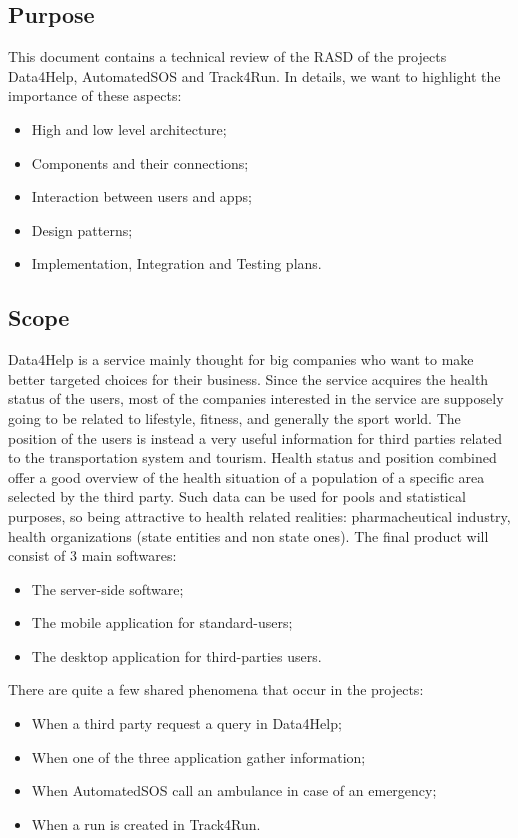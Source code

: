 {\color{secblue}\subsection{Purpose}}
This document contains a technical review of the RASD of the projects Data4Help, AutomatedSOS and Track4Run.
In details, we want to highlight the importance of these aspects:
\begin{itemize}
\item High and low level architecture;
\item Components and their connections;
\item Interaction between users and apps;
\item Design patterns;
\item Implementation, Integration and Testing plans.
\end{itemize}
{\color{secblue}\subsection{Scope}}
Data4Help is a service mainly thought for big companies who want to make better targeted choices for their business. Since the service acquires the health status of the users, most of the companies interested in the service are supposely going to be related to lifestyle, fitness, and generally the sport world.
The position of the users is instead a very useful information for third parties related to the transportation system and tourism.
Health status and position combined offer a good overview of the health situation of a population of a specific area selected by the third party. Such data can be used for pools and statistical purposes, so being attractive to health related realities: pharmacheutical industry, health organizations (state entities and non state ones).
The final product will consist of 3 main softwares:
\begin{itemize}
\item The server-side software;
\item The mobile application for standard-users;
\item The desktop application for third-parties users.
\end{itemize}
There are quite a few shared phenomena that occur in the projects:
\begin{itemize}
\item When a third party request a query in Data4Help;
\item When one of the three application gather information;
\item When AutomatedSOS call an ambulance in case of an emergency;
\item When a run is created in Track4Run.
\end{itemize}

